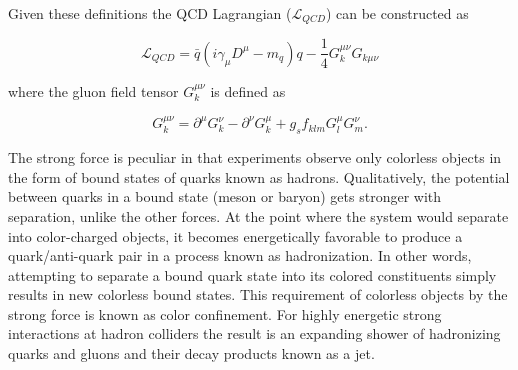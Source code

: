 Given these definitions the QCD Lagrangian ($\mathcal{L}_{QCD}$) can be
constructed as 

\begin{equation} \label{eq:qcd:qcd_lagrangian}
\mathcal{L}_{QCD} = \bar{q}(i\gamma_{\mu}D^{\mu} - m_{q})q -
\frac{1}{4}G_{k}^{\mu\nu}G_{k\mu\nu}
\end{equation}

where the gluon field tensor $G_{k}^{\mu\nu}$ is defined as

\begin{equation} \label{eq:qcd:gluon_tensor}
G_{k}^{\mu\nu} = \partial^{\mu}G_{k}^{\nu} - \partial^{\nu}G_{k}^{\mu} +
g_{s}f_{klm}G_{l}^{\mu}G_{m}^{\nu}.
\end{equation}

The strong force is peculiar in that experiments observe only colorless objects
in the form of bound states of quarks known as hadrons.  Qualitatively, the
potential between quarks in a bound state (meson or baryon) gets stronger with
separation, unlike the other forces.  At the point where the system would
separate into color-charged objects, it becomes energetically favorable to
produce a quark/anti-quark pair in a process known as hadronization.  In other
words, attempting to separate a bound quark state into its colored constituents
simply results in new colorless bound states.  This requirement of colorless
objects by the strong force is known as color confinement. For highly energetic
strong interactions at hadron colliders the result is an expanding shower of
hadronizing quarks and gluons and their decay products known as a jet.

